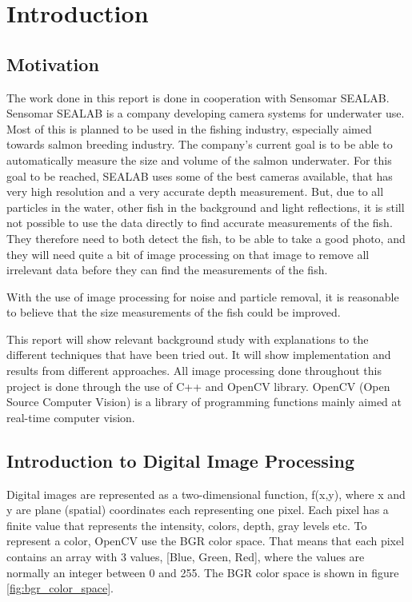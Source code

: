 \section{Introduction}\label{introduction}

\subsection{Motivation}\label{motivation}
The work done in this report is done in cooperation with Sensomar SEALAB.
Sensomar SEALAB is a company developing camera systems for underwater use. Most of this is planned to be used in the fishing industry, especially aimed towards salmon breeding industry. The company's current goal is to be able to automatically measure the size and volume of the salmon underwater. For this goal to be reached, SEALAB uses some of the best cameras available, that has very high resolution and a very accurate depth measurement. But, due to all particles in the water, other fish in the background and light reflections, it is still not possible to use the data directly to find accurate measurements of the fish. They therefore need to both detect the fish, to be able to take a good photo, and they will need quite a bit of image processing on that image to remove all irrelevant data before they can find the measurements of the fish. 

With the use of image processing for noise and particle removal, it is reasonable to believe that the size measurements of the fish could be improved.

This report will show relevant background study with explanations to the different techniques that have been tried out. It will show implementation and results from different approaches. All image processing done throughout this project is done through the use of C++ and OpenCV library. OpenCV (Open Source Computer Vision) is a library of programming functions mainly aimed at real-time computer vision. \cite{website:opencv_wiki}


\subsection{Introduction to Digital Image Processing}
 
Digital images are represented as a two-dimensional function, f(x,y), where x and y are plane (spatial) coordinates each representing one pixel. Each pixel has a finite value that represents the intensity, colors, depth, gray levels etc. To represent a color, OpenCV use the BGR color space. That means that each pixel contains an array with 3 values, [Blue, Green, Red], where the values are normally an integer between 0 and 255. The BGR color space is shown in figure \ref{fig:bgr_color_space}.

